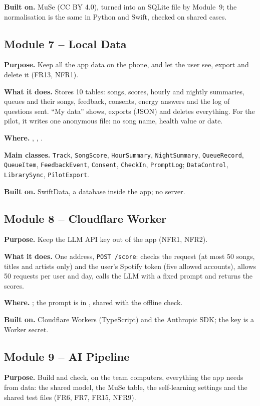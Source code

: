 \documentclass[conference]{IEEEtran}
\newcommand{\field}[1]{\noindent\textbf{#1}}
\begin{document}
\field{Built on.} MuSe (CC BY 4.0), turned into an SQLite file by Module~9; the normalisation is the same in Python and Swift, checked on shared cases.

\subsection{Module 7 -- Local Data}
\field{Purpose.} Keep all the app data on the phone, and let the user see, export and delete it (FR13, NFR1).

\field{What it does.} Stores 10 tables: songs, scores, hourly and nightly summaries, queues and their songs, feedback, consents, energy answers and the log of questions sent. ``My data'' shows, exports (JSON) and deletes everything. For the pilot, it writes one anonymous file: no song name, health value or date.

\field{Where.} , , .

\field{Main classes.} \texttt{Track}, \texttt{SongScore}, \texttt{HourSummary}, \texttt{NightSummary}, \texttt{QueueRecord}, \texttt{QueueItem}, \texttt{FeedbackEvent}, \texttt{Consent}, \texttt{CheckIn}, \texttt{PromptLog}; \texttt{DataControl}, \texttt{LibrarySync}, \texttt{PilotExport}.

\field{Built on.} SwiftData, a database inside the app; no server.

\subsection{Module 8 -- Cloudflare Worker}
\field{Purpose.} Keep the LLM API key out of the app (NFR1, NFR2).

\field{What it does.} One address, \texttt{POST /score}: checks the request (at most 50 songs, titles and artists only) and the user's Spotify token (five allowed accounts), allows 50 requests per user and day, calls the LLM with a fixed prompt and returns the scores.

\field{Where.} ; the prompt is in , shared with the offline check.

\field{Built on.} Cloudflare Workers (TypeScript) and the Anthropic SDK; the key is a Worker secret.

\subsection{Module 9 -- AI Pipeline}
\field{Purpose.} Build and check, on the team computers, everything the app needs from data: the shared model, the MuSe table, the self-learning settings and the shared test files (FR6, FR7, FR15, NFR9).
\end{document}
